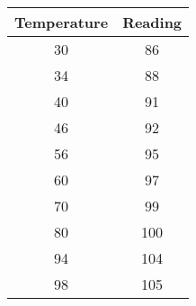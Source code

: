 
\begin{tabular}[]{|c|c|}
\hline
Temperature	& Reading	\\ \hline
  30  & 86  \\ \hline
  34  & 88  \\ \hline
  40  & 91  \\ \hline
  46  & 92  \\ \hline
  56  & 95  \\ \hline
  60  & 97  \\ \hline
  70  & 99  \\ \hline
  80  & 100  \\ \hline
  94  & 104  \\ \hline
  98  & 105  \\ \hline
\end{tabular}